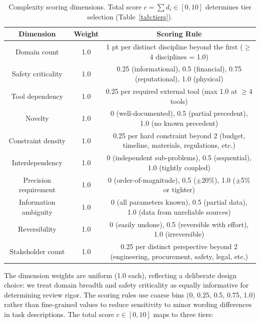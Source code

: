 \documentclass[11pt,a4paper]{article}
\begin{document}
\begin{table}[htbp]
\centering
\begin{tabular}{c|c|c}
\toprule
\textbf{Dimension} & \textbf{Weight} & \textbf{Scoring Rule} \\
\midrule
Domain count          & 1.0 & 1 pt per distinct discipline beyond the first ($\geq$4 disciplines = 1.0) \\
Safety criticality    & 1.0 & 0.25 (informational), 0.5 (financial), 0.75 (reputational), 1.0 (physical) \\
Tool dependency       & 1.0 & 0.25 per required external tool (max 1.0 at $\geq$4 tools) \\
Novelty               & 1.0 & 0 (well-documented), 0.5 (partial precedent), 1.0 (no known precedent) \\
Constraint density    & 1.0 & 0.25 per hard constraint beyond 2 (budget, timeline, materials, regulations, etc.) \\
Interdependency       & 1.0 & 0 (independent sub-problems), 0.5 (sequential), 1.0 (tightly coupled) \\
Precision requirement & 1.0 & 0 (order-of-magnitude), 0.5 ($\pm$20\%), 1.0 ($\pm$5\% or tighter) \\
Information ambiguity & 1.0 & 0 (all parameters known), 0.5 (partial data), 1.0 (data from unreliable sources) \\
Reversibility         & 1.0 & 0 (easily undone), 0.5 (reversible with effort), 1.0 (irreversible) \\
Stakeholder count     & 1.0 & 0.25 per distinct perspective beyond 2 (engineering, procurement, safety, legal, etc.) \\
\bottomrule
\end{tabular}
\caption{Complexity scoring dimensions. Total score $c = \sum d_i \in [0, 10]$ determines tier selection (Table~\ref{tab:tiers}).}
\label{tab:dimensions}
\end{table}

The dimension weights are uniform (1.0 each), reflecting a deliberate design choice: we treat domain breadth and safety criticality as equally informative for determining review rigor. The scoring rules use coarse bins (0, 0.25, 0.5, 0.75, 1.0) rather than fine-grained values to reduce sensitivity to minor wording differences in task descriptions. The total score $c \in [0, 10]$ maps to three tiers:
\end{document}
